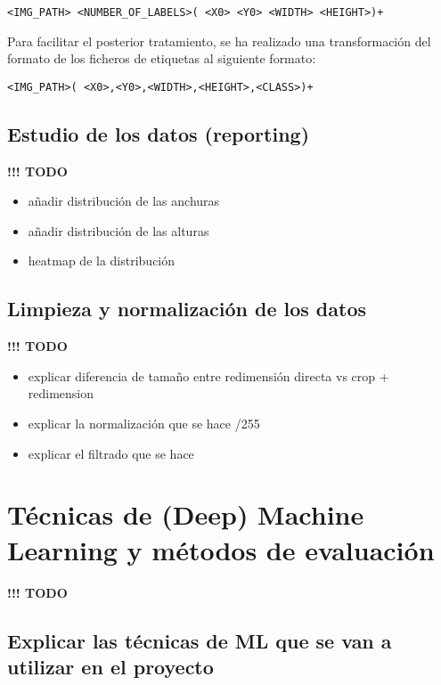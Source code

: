 \documentclass[]{article}
\begin{document}
\begin{lstlisting}[frame=single,basicstyle=\ttfamily\footnotesize]
<IMG_PATH> <NUMBER_OF_LABELS>( <X0> <Y0> <WIDTH> <HEIGHT>)+
\end{lstlisting}

Para facilitar el posterior tratamiento, se ha realizado una transformación del formato de los ficheros de etiquetas al siguiente formato:

\begin{lstlisting}[frame=single,basicstyle=\ttfamily\footnotesize]
<IMG_PATH>( <X0>,<Y0>,<WIDTH>,<HEIGHT>,<CLASS>)+
\end{lstlisting}

\subsection{Estudio de los datos (reporting)}

\textbf{!!! TODO}
\begin{itemize}
	\item añadir distribución de las anchuras
	\item añadir distribución de las alturas
	\item heatmap de la distribución
\end{itemize}

\subsection{Limpieza y normalización de los datos}

\textbf{!!! TODO}
\begin{itemize}
	\item explicar diferencia de tamaño entre redimensión directa vs crop + redimension
	\item explicar la normalización que se hace /255
	\item explicar el filtrado que se hace
\end{itemize}

\section{Técnicas de (Deep) Machine Learning y métodos de evaluación}

\textbf{!!! TODO}


\subsection{Explicar las técnicas de ML que se van a utilizar en el proyecto}
\end{document}
